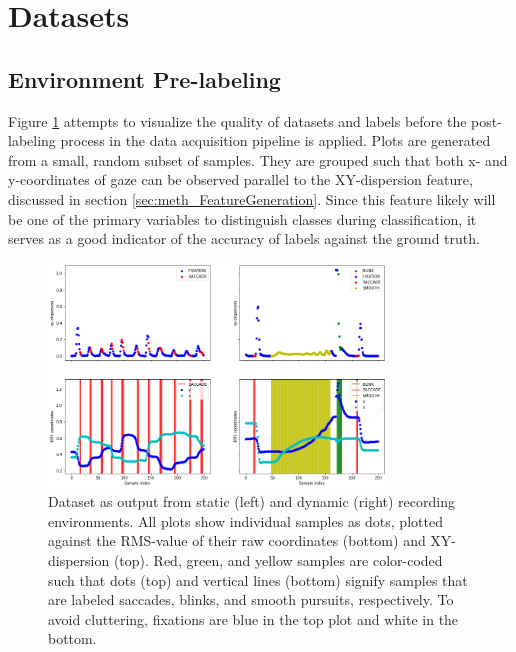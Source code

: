 \section{Datasets} \label{sec:res_Datasets}

\subsection{Environment Pre-labeling}

Figure \ref{fig:res_DatasetsPrelabel} attempts to visualize the quality of datasets and labels before the post-labeling process in the data acquisition pipeline is applied. Plots are generated from a small, random subset of samples. They are grouped such that both x- and y-coordinates of gaze can be observed parallel to the XY-dispersion feature, discussed in section \ref{sec:meth_FeatureGeneration}. Since this feature likely will be one of the primary variables to distinguish classes during classification, it serves as a good indicator of the accuracy of labels against the ground truth.

\begin{figure}[h]
    \centering
    \includegraphics[width=0.8\textwidth]{Images/Dataset/DatasetsPrelabel.png}
    \caption{Dataset as output from static (left) and dynamic (right) recording environments. All plots show individual samples as dots, plotted against the RMS-value of their raw coordinates (bottom) and XY-dispersion (top). Red, green, and yellow samples are color-coded such that dots (top) and vertical lines (bottom) signify samples that are labeled saccades, blinks, and smooth pursuits, respectively. To avoid cluttering, fixations are blue in the top plot and white in the bottom.}
    \label{fig:res_DatasetsPrelabel}
\end{figure}


